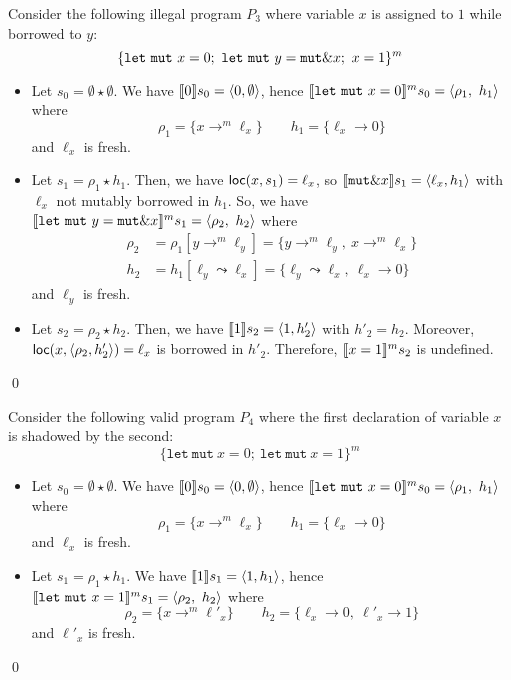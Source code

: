 \begin{example}
  Consider the following illegal program $P_3$
  where variable $x$ is assigned to $1$ while
  borrowed to $y$:
  \[
    \{
      \mathtt{let\ mut}\ x = 0;\
      \mathtt{let\ mut}\ y = \mathtt{mut}\borrow x;\
      x = 1
    \}^m
  \]
  \begin{itemize}
    \item Let $s_0=\emptyset \star \emptyset$.
    We have $\den[0]{s_0} = \langle 0,\emptyset\rangle$, hence
    $\denl[\mathtt{let\ mut}\ x = 0]{m}{s_0} =
    \langle \rho_1,\ h_1\rangle$ where
    \[\rho_1=\{x\to^m\ell_x\} \qquad
    h_1 = \{\ell_x\to 0\}\]
    and $\ell_x$ is fresh.
    \item Let $s_1 = \rho_1 \star h_1$.
    Then, we have $\loc(x,s_1) = \ell_x$, so
    $\den[\mathtt{mut}\borrow x]{s_1} = \langle \ell_x,h_1\rangle$
    with $\ell_x$ not mutably borrowed in $h_1$.
    So, we have
    $\denl[\mathtt{let\ mut}\ y = \mathtt{mut}\borrow x]{m}{s_1} =
    \langle \rho_2,\ h_2\rangle$
    where
    \begin{align*}
      \rho_2 & = \rho_1[y\to^m\ell_y] = \{y\to^m\ell_y,\ x\to^m\ell_x\}\\
      h_2 & = h_1[\ell_y\leadsto \ell_x] =
      \{\ell_y\leadsto \ell_x,\ \ell_x\to 0\}
    \end{align*}
    and $\ell_y$ is fresh.
    \item Let $s_2 = \rho_2 \star h_2$.
    Then, we have $\den[1]{s_2} = \langle 1,h'_2\rangle$ with $h'_2=h_2$.
    Moreover, $\loc(x,\langle\rho_2,h'_2\rangle) = \ell_x$ is borrowed in $h'_2$.
    Therefore, $\denl[x = 1]{m}{s_2}$ is undefined.
  \end{itemize}
  \qed
\end{example}

\begin{example}
  Consider the following valid program $P_4$
  where the first declaration of variable $x$ is
  shadowed by the second:
  \[
    \{
      \mathtt{let\ mut}\ x = 0;\
      \mathtt{let\ mut}\ x = 1
    \}^m
  \]
  \begin{itemize}
    \item Let $s_0=\emptyset \star \emptyset$.
    We have $\den[0]{s_0} = \langle 0,\emptyset\rangle$, hence
    $\denl[\mathtt{let\ mut}\ x = 0]{m}{s_0} =
    \langle \rho_1,\ h_1\rangle$ where
    \[\rho_1=\{x\to^m\ell_x\} \qquad
    h_1 = \{\ell_x\to 0\}\]
    and $\ell_x$ is fresh.
    \item Let $s_1 = \rho_1 \star h_1$.
    We have $\den[1]{s_1} = \langle 1,h_1\rangle$, hence
    $\denl[\mathtt{let\ mut}\ x = 1]{m}{s_1} =
    \langle \rho_2,\ h_2\rangle$ where
    \[\rho_2=\{x\to^m\ell'_x\} \qquad
    h_2 = \{\ell_x\to 0,\ \ell'_x\to 1\}\]
    and $\ell'_x$ is fresh.
  \end{itemize}
  \qed
\end{example}

